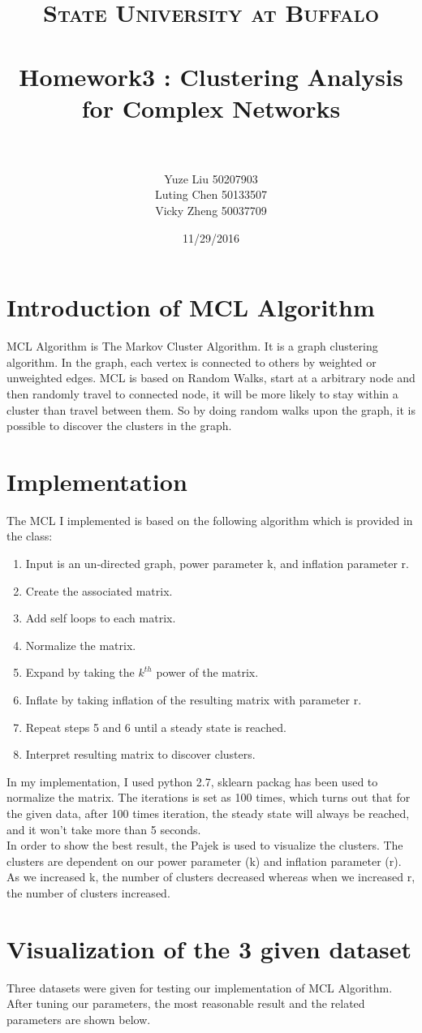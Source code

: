 \documentclass[paper=letter, fontsize=11pt]{article}
\title{
		\usefont{OT1}{bch}{b}{n}
		\normalfont \normalsize \textsc{State University at Buffalo} \\ [25pt]
		\horrule{0.5pt} \\[0.4cm]
		\Large Homework3 : Clustering Analysis for Complex Networks \\
		\horrule{2pt} \\[0.5cm]
}
\author{
		\normalfont\large 								
        Yuze Liu \hspace{1.2cm}50207903\\
        \normalfont\large 
        Luting Chen \hspace{0.5cm}50133507\\
        \normalfont\large 
        Vicky Zheng \hspace{0.5cm}50037709\\
}
\date{\large 11/29/2016}
\numberwithin{equation}{section}		%
\numberwithin{figure}{section}			%
\numberwithin{table}{section}				%
\begin{document}
\maketitle
\section{Introduction of MCL Algorithm}
MCL Algorithm is The Markov Cluster Algorithm. It is a graph clustering algorithm. In the graph, each vertex is connected to others by weighted or unweighted edges. MCL is based on Random Walks, start at a arbitrary node and then randomly travel to connected node, it will be more likely to stay within a cluster than travel between them. So by doing random walks upon the graph, it is possible to discover the clusters in the graph.
\section{Implementation}
The MCL I implemented is based on the following algorithm which is provided in the class:
\begin{enumerate}
	\item Input is an un-directed graph, power parameter k, and inflation parameter r.
	\item Create the associated matrix.
	\item Add self loops to each matrix.
	\item Normalize the matrix.
	\item Expand by taking the $k^{th}$ power of the matrix.
	\item Inflate by taking inflation of the resulting matrix with parameter r.
	\item Repeat steps 5 and 6 until a steady state is reached.
	\item Interpret resulting matrix to discover clusters.
\end{enumerate}
In my implementation, I used python 2.7, sklearn packag has been used to normalize the matrix. The iterations is set as 100 times, which turns out that for the given data, after 100 times iteration, the steady state will always be reached, and it won't take more than 5 seconds.\\
In order to show the best result, the Pajek is used to visualize the clusters. The clusters are dependent on our power parameter (k) and inflation parameter (r). As we increased k, the number of clusters decreased whereas when we increased r, the number of clusters increased. 
\section{Visualization of the 3 given dataset}
Three datasets were given for testing our implementation of MCL Algorithm. After tuning our parameters, the most reasonable result and the related parameters are shown below.\\
\end{document}
